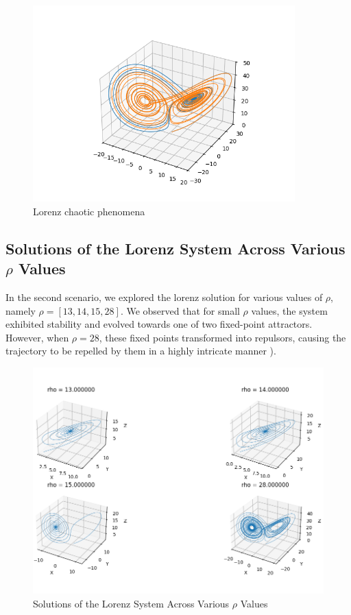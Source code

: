 \documentclass[a4paper,12pt,french]{article}
\begin{document}
\begin{figure}[ht!]
    \centering
    \includegraphics[width=0.9\textwidth]{img/Figure_1.png}
    \caption{Lorenz chaotic phenomena}
    \label{fig:4}
\end{figure}
\newpage
\subsection{Solutions of the Lorenz System Across Various $\rho$ Values}
In the second scenario, we explored the lorenz solution for various values of $\rho$, namely $\rho = [13, 14, 15, 28]$. We observed that for small $\rho$ values, the system exhibited stability and evolved towards one of two fixed-point attractors. However, when $\rho = 28$, these fixed points transformed into repulsors, causing the trajectory to be repelled by them in a highly intricate manner ).
\begin{figure}[H]
    \centering
    \includegraphics[width=1.\textwidth]{img/lorenz_rho.png}
    \caption{Solutions of the Lorenz System Across Various $\rho$ Values}
    \label{fig:8}
\end{figure}
\newpage
\end{document}

